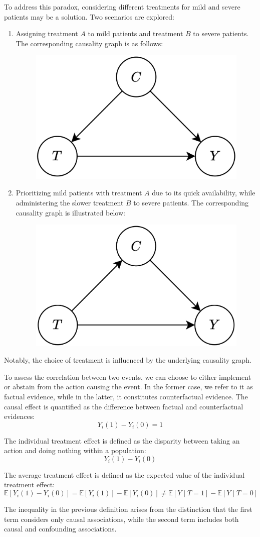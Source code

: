 \begin{example}
    To address this paradox, considering different treatments for mild and severe patients may be a solution. 
    Two scenarios are explored:
    \begin{enumerate}
        \item Assigning treatment $A$ to mild patients and treatment $B$ to severe patients. 
            The corresponding causality graph is as follows:
            \begin{figure}[H]
                \centering
                \includegraphics[width=0.25\linewidth]{images/cau.png}
            \end{figure}
        \item Prioritizing mild patients with treatment $A$ due to its quick availability, while administering the slower treatment $B$ to severe patients.
        The corresponding causality graph is illustrated below:
            \begin{figure}[H]
                \centering
                \includegraphics[width=0.25\linewidth]{images/cau1.png}
            \end{figure}
    \end{enumerate}
    Notably, the choice of treatment is influenced by the underlying causality graph.
\end{example}

To assess the correlation between two events, we can choose to either implement or abstain from the action causing the event.
In the former case, we refer to it as factual evidence, while in the latter, it constitutes counterfactual evidence.
The causal effect is quantified as the difference between factual and counterfactual evidences:
\[Y_i(1)-Y_i(0)=1\]
\begin{definition}
    The individual treatment effect is defined as the disparity between taking an action and doing nothing within a population:
    \[Y_i(1)-Y_i(0)\]
\end{definition}
\begin{definition}
    The average treatment effect is defined as the expected value of the individual treatment effect:
    \[\mathbb{E}\left[Y_i(1)-Y_i(0)\right]=\mathbb{E}\left[Y_i(1)\right]-\mathbb{E}\left[Y_i(0)\right] \neq \mathbb{E}\left[ Y\mid T=1 \right]-\mathbb{E}\left[ Y\mid T=0 \right]\]
\end{definition}
The inequality in the previous definition arises from the distinction that the first term considers only causal associations, while the second term includes both causal and confounding associations.


